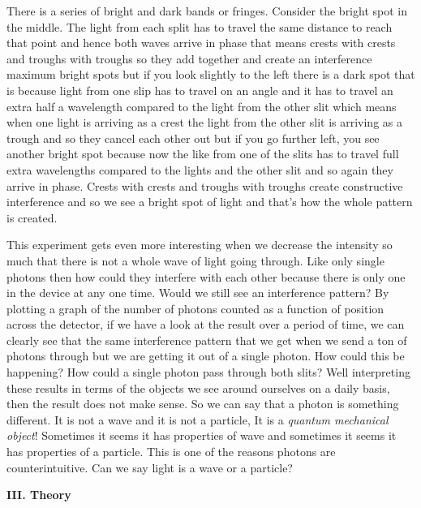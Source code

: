 \documentclass[fleqn]{article}
\begin{document}
  There is a series of bright and dark bands or fringes. Consider the bright spot in the middle. The light from each split
  has to travel the same distance to reach that point and hence both waves arrive in phase that means crests with crests 
  and troughs with troughs so they add together and create an interference maximum bright spots but if you look slightly 
  to the left there is a dark spot that is because light from one slip has to travel on an angle and it has to travel 
  an extra half a wavelength compared to the light from the other slit which means when one light is arriving as a crest 
  the light from the other slit is arriving as a trough and so they cancel each other out but if you go further left, 
  you see another bright spot because now the like from one of the slits has to travel full extra wavelengths compared to 
  the lights and the other slit and so again they arrive in phase. Crests with crests and troughs with troughs create 
  constructive interference and so we see a bright spot of light and that's how the whole pattern is created.
  
  This experiment gets even more interesting when we decrease the intensity so much that there is not a whole wave of 
  light going through. Like only single photons then how could they interfere with each other because there is only one 
  in the device at any one time. Would we still see an interference pattern? By plotting a graph of the number of photons
  counted as a function of position across the detector, if we have a look at the result over a period of time, we can 
  clearly see that the same interference pattern that we get when we send a ton of photons through but we are getting 
  it out of a single photon. How could this be happening? How could a single photon pass through both slits? Well 
  interpreting these results in terms of the objects we see around ourselves on a daily basis, then the result does not 
  make sense. So we can say that a photon is something different. It is not a wave and it is not a particle, It is a 
  \emph{quantum mechanical object}! Sometimes it seems it has properties of wave and sometimes it seems it has properties
  of a particle. This is one of the reasons photons are counterintuitive. Can we say light is a wave or a particle? 

  \vspace{20px}


  \textbf{III. Theory}

  \vspace{10px}
\end{document}
